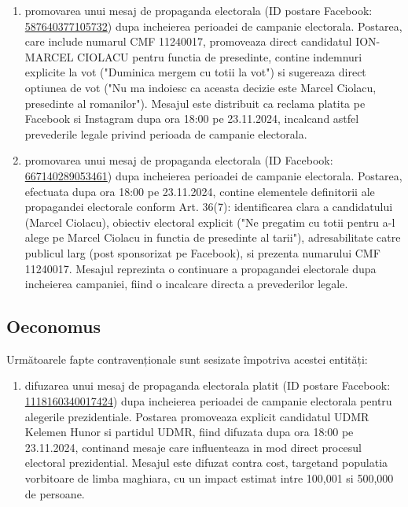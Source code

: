 \documentclass[a4paper,12pt]{article}
\begin{document}
\begin{enumerate}[leftmargin=*, label=\arabic*.)]
    \item promovarea unui mesaj de propaganda electorala (ID postare Facebook: \href{https://www.facebook.com/ads/library/?id=587640377105732}{587640377105732}) dupa incheierea perioadei de campanie electorala. Postarea, care include numarul CMF 11240017, promoveaza direct candidatul ION-MARCEL CIOLACU pentru functia de presedinte, contine indemnuri explicite la vot ("Duminica mergem cu totii la vot") si sugereaza direct optiunea de vot ("Nu ma indoiesc ca aceasta decizie este Marcel Ciolacu, presedinte al romanilor"). Mesajul este distribuit ca reclama platita pe Facebook si Instagram dupa ora 18:00 pe 23.11.2024, incalcand astfel prevederile legale privind perioada de campanie electorala.
    \item promovarea unui mesaj de propaganda electorala (ID Facebook: \href{https://www.facebook.com/ads/library/?id=667140289053461}{667140289053461}) dupa incheierea perioadei de campanie electorala. Postarea, efectuata dupa ora 18:00 pe 23.11.2024, contine elementele definitorii ale propagandei electorale conform Art. 36(7): identificarea clara a candidatului (Marcel Ciolacu), obiectiv electoral explicit ("Ne pregatim cu totii pentru a-l alege pe Marcel Ciolacu in functia de presedinte al tarii"), adresabilitate catre publicul larg (post sponsorizat pe Facebook), si prezenta numarului CMF 11240017. Mesajul reprezinta o continuare a propagandei electorale dupa incheierea campaniei, fiind o incalcare directa a prevederilor legale.
\end{enumerate}

\vspace{0.5cm}

\subsection{Oeconomus}
Următoarele fapte contravenționale sunt sesizate împotriva acestei entități:

\begin{enumerate}[leftmargin=*, label=\arabic*.)]
    \item difuzarea unui mesaj de propaganda electorala platit (ID postare Facebook: \href{https://www.facebook.com/ads/library/?id=1118160340017424}{1118160340017424}) dupa incheierea perioadei de campanie electorala pentru alegerile prezidentiale. Postarea promoveaza explicit candidatul UDMR Kelemen Hunor si partidul UDMR, fiind difuzata dupa ora 18:00 pe 23.11.2024, continand mesaje care influenteaza in mod direct procesul electoral prezidential. Mesajul este difuzat contra cost, targetand populatia vorbitoare de limba maghiara, cu un impact estimat intre 100,001 si 500,000 de persoane.
\end{enumerate}
\end{document}
